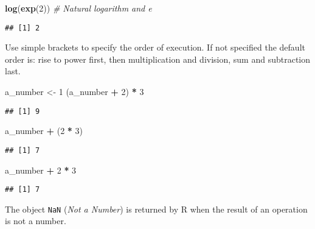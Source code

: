 \documentclass[
]{book}
\newenvironment{Shaded}{\begin{snugshade}}{\end{snugshade}}
\newcommand{\CommentTok}[1]{\textcolor[rgb]{0.56,0.35,0.01}{\textit{#1}}}
\newcommand{\DecValTok}[1]{\textcolor[rgb]{0.00,0.00,0.81}{#1}}
\newcommand{\KeywordTok}[1]{\textcolor[rgb]{0.13,0.29,0.53}{\textbf{#1}}}
\newcommand{\NormalTok}[1]{#1}
\newcommand{\OperatorTok}[1]{\textcolor[rgb]{0.81,0.36,0.00}{\textbf{#1}}}
\newcommand{\StringTok}[1]{\textcolor[rgb]{0.31,0.60,0.02}{#1}}
\begin{document}
\begin{Shaded}
\begin{Highlighting}[]
\KeywordTok{log}\NormalTok{(}\KeywordTok{exp}\NormalTok{(}\DecValTok{2}\NormalTok{)) }\CommentTok{# Natural logarithm and e}
\end{Highlighting}
\end{Shaded}

\begin{verbatim}
## [1] 2
\end{verbatim}

Use simple brackets to specify the order of execution. If not specified the default order is: rise to power first, then multiplication and division, sum and subtraction last.

\begin{Shaded}
\begin{Highlighting}[]
\NormalTok{a_number <-}\StringTok{ }\DecValTok{1}
\NormalTok{(a_number }\OperatorTok{+}\StringTok{ }\DecValTok{2}\NormalTok{) }\OperatorTok{*}\StringTok{ }\DecValTok{3}
\end{Highlighting}
\end{Shaded}

\begin{verbatim}
## [1] 9
\end{verbatim}

\begin{Shaded}
\begin{Highlighting}[]
\NormalTok{a_number }\OperatorTok{+}\StringTok{ }\NormalTok{(}\DecValTok{2} \OperatorTok{*}\StringTok{ }\DecValTok{3}\NormalTok{)}
\end{Highlighting}
\end{Shaded}

\begin{verbatim}
## [1] 7
\end{verbatim}

\begin{Shaded}
\begin{Highlighting}[]
\NormalTok{a_number }\OperatorTok{+}\StringTok{ }\DecValTok{2} \OperatorTok{*}\StringTok{ }\DecValTok{3}
\end{Highlighting}
\end{Shaded}

\begin{verbatim}
## [1] 7
\end{verbatim}

The object \texttt{NaN} (\emph{Not a Number}) is returned by R when the result of an operation is not a number.
\end{document}
